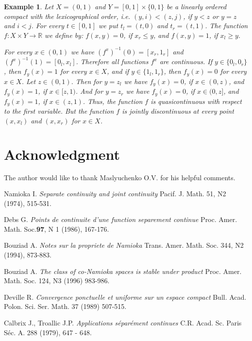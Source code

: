 \documentclass{amsart}
\newtheorem{example}[theorem]{Example}
\begin{document}
\begin{example} Let $X=(0,1)$ and $Y=[0,1]\times \{0,1\}$ be a linearly ordered compact with the lexicographical order, i.e. $(y,i)<(z,j)$, if $y<z$ or $y=z$ and $i<j$. For every $t\in [0,1]$ we put $t_l=(t,0)$ and $t_r=(t,1)$. The function $f:X\times Y\to \mathbb R$ we define by: $f(x,y)=0$, if $x_r\leq y$, and $f(x,y)=1$, if $x_l\geq y$.

For every $x\in (0,1)$ we have $(f^x)^{-1}(0)=[x_r,1_r]$ and $(f^x)^{-1}(1)=[0_l,x_l]$. Therefore all functions $f^x$ are continuous. If $y\in \{0_l,0_r\}$, then $f_y(x)=1$ for every $x\in X$, and if $y\in \{1_l,1_r\}$, then $f_y(x)=0$ for every $x\in X$. Let $z\in (0,1)$. Then for $y=z_l$ we have $f_y(x)=0$, if $x\in
(0,z)$, and $f_y(x)=1$, if $x\in [z,1)$. And for $y=z_r$ we have $f_y(x)=0$, if $x\in (0,z]$, and $f_y(x)=1$, if $x\in (z,1)$. Thus, the function $f$ is quasicontinuous with respect to the first variable. But the function $f$ is jointly discontinuous at every point $(x,x_l)$ and $(x,x_r)$ for $x\in X$.\end{example}

\section{Acknowledgment}
The author would like to thank Maslyuchenko O.V. for his helpful comments.


\begin{thebibliography}{10}

 Namioka I. {\it Separate continuity and joint continuity} Pacif. J. Math. 51, N2 (1974), 515-531.

 Debs G. {\it Points de continuite d'une function separement continue} Proc. Amer. Math. Soc.{\bf 97}, N 1 (1986), 167-176.

 Bouziad A. {\it Notes sur la propriete de Namioka} Trans. Amer. Math. Soc. 344, N2 (1994), 873-883.

 Bouziad A. {\it The class of co-Namioka spaces is stable under product} Proc. Amer. Math. Soc. 124, N3 (1996) 983-986.

 Deville R. {\it  Convergence ponctuelle et uniforme sur un espace compact} Bull. Acad. Polon. Sci. Ser. Math. 37 (1989) 507-515.

 Calbrix J., Troallic J.P. {\it Applications s\'{e}par\'{e}ment continues} C.R. Acad. Sc. Paris S\'{e}c. A. 288 (1979), 647 - 648.

\end{thebibliography}
\end{document}

